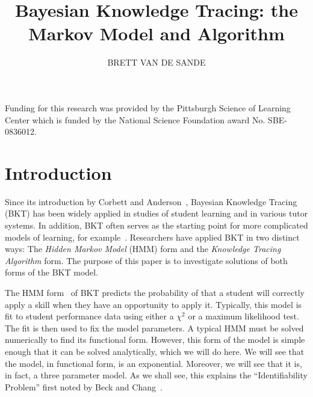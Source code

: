 \documentclass{acmlarge-edm}
\title{Bayesian Knowledge Tracing:  the Markov Model and Algorithm}
\author{BRETT VAN DE SANDE
\affil{Arizona State University\\bvds@asu.edu}}
\begin{document}


\begin{bottomstuff}
Funding for this research was provided by the Pittsburgh Science of
Learning Center which is funded by the National Science Foundation
award No. SBE-0836012.
\end{bottomstuff}

\maketitle

%
%


\section{Introduction}

Since its introduction by Corbett and Anderson~\citeyear{corbett_knowledge_1994}, 
Bayesian Knowledge Tracing (BKT) has been widely applied
in studies of student learning and in various tutor systems.  
In addition, BKT often serves as the starting
%
%
point for more complicated models of learning, for 
example~\cite{baker_r._improving_2008,lee_impact_2012}.
Researchers have applied BKT in two distinct ways:  The {\em Hidden Markov Model}
(HMM) form and the {\em Knowledge Tracing Algorithm} form.
The purpose of this paper is to investigate solutions of both
forms of the BKT model.

The HMM form~\cite{beck_identifiability:_2007} of BKT 
predicts the probability of that a student will 
correctly apply a skill when they have an opportunity to apply it.
Typically, this model is fit to student performance data 
using either a $\chi^2$ or a maximum likelihood test.  The 
fit is then used to fix the model parameters.
A typical HMM must be solved numerically to find its functional form.
However, this form of the model is simple enough that it can be 
solved analytically, which we will do here.  We will see that the model, 
in functional form, is an exponential.  Moreover, we will see that 
it is, in fact, a three parameter model.  As we shall see, 
this explains the ``Identifiability Problem'' first noted by 
Beck and Chang~\citeyear{beck_identifiability:_2007}.
\end{document}
